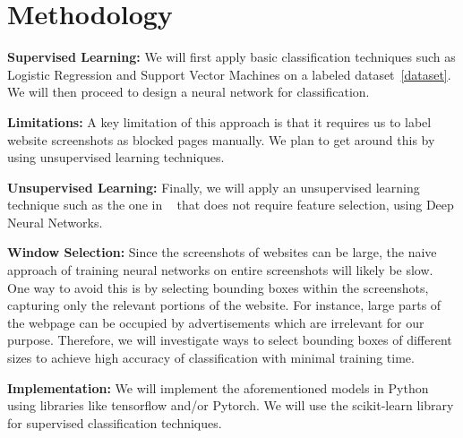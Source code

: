 \documentclass{article} %
\begin{document}
\section{Methodology}

\textbf{Supervised Learning:}
We will first apply basic classification techniques such as Logistic Regression and Support Vector Machines on a labeled dataset~\ref{dataset}.
We will then proceed to design a neural network for classification.

\textbf{Limitations:} A key limitation of this approach is that it requires us to label website screenshots as blocked pages manually. We plan to get around this by using unsupervised
learning techniques.

\textbf{Unsupervised Learning:}
 Finally, we will apply an unsupervised learning technique
such as the one in ~\cite{meerkat} that does not require feature selection, using Deep Neural Networks.

\textbf{Window Selection:}
Since the screenshots of websites can be large, the naive approach of training neural networks on entire screenshots will likely be slow.
One way to avoid this is by selecting bounding boxes within the screenshots, capturing only the relevant portions of the website. For instance,
large parts of the webpage can be occupied by advertisements which are irrelevant for our purpose. Therefore, we will investigate ways to select
bounding boxes of different sizes to achieve high accuracy of classification with minimal training time.

\textbf{Implementation:}
We will implement the aforementioned models in Python using libraries like tensorflow and/or Pytorch. We will use the scikit-learn library for supervised classification techniques.
\end{document}
